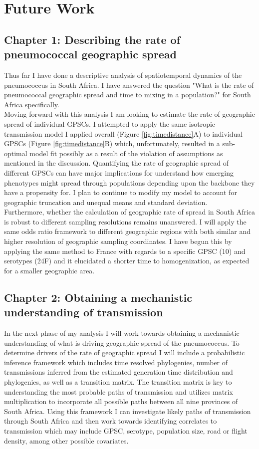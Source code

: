 \documentclass{article}
\begin{document}
\section{Future Work}
\subsection{Chapter 1: Describing the rate of pneumococcal geographic spread}
Thus far I have done a descriptive analysis of spatiotemporal dynamics of the pneumococcus in South Africa. I have answered the question "What is the rate of pneumococcal geographic spread and time to mixing in a population?" for South Africa specifically. \\Moving forward with this analysis I am looking to estimate the rate of geographic spread of individual GPSCs. I attempted to apply the same isotropic transmission model I applied overall (Figure \ref{fig:timedistance}A) to individual GPSCs (Figure \ref{fig:timedistance}B)  which, unfortunately, resulted in a sub-optimal model fit possibly as a result of the violation of assumptions as mentioned in the discussion. Quantifying the rate of geographic spread of different GPSCs can have major implications for understand how emerging phenotypes might spread through populations depending upon the backbone they have a propensity for. I plan to continue to modify my model to account for geographic truncation and unequal means and standard deviation.\\ Furthermore, whether the calculation of geographic rate of spread in South Africa is robust to different sampling resolutions remains unanswered. I will apply the same odds ratio framework to different geographic regions with both similar and higher resolution of geographic sampling coordinates. I have begun this by applying the same method to France with regards to a specific GPSC (10) and serotypes (24F) and it elucidated a shorter time to homogenization, as expected for a smaller geographic area. 
\subsection{Chapter 2: Obtaining a mechanistic understanding of transmission}
In the next phase of my analysis I will work towards obtaining a mechanistic understanding of what is driving geographic spread of the pneumococcus. To determine drivers of the rate of geographic spread I will include a probabilistic inference framework which includes time resolved phylogenies, number of transmissions inferred from the estimated generation time distribution and phylogenies, as well as a transition matrix. The transition matrix is key to understanding the most probable paths of transmission and utilizes matrix multiplication to incorporate all possible paths between all nine provinces of South Africa. Using this framework I can investigate likely paths of transmission through South Africa and then work towards identifying correlates to transmission which may include GPSC, serotype, population size, road or flight density, among other possible covariates\cite{saljeReconstructingUnseenTransmission2020a}.
\end{document}

